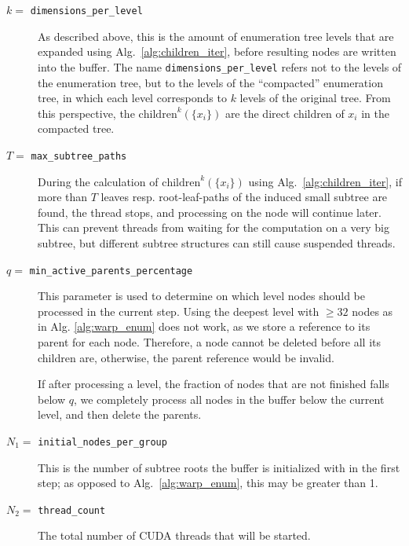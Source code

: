 \documentclass{scrartcl}
\begin{document}
    \begin{description}
        \item[$k =$ \texttt{dimensions\_per\_level}]
            As described above, this is the amount of enumeration tree levels that are expanded using Alg.\ \ref{alg:children_iter}, before resulting nodes are written into the buffer. The name \texttt{dimensions\_per\_level} refers not to the levels of the enumeration tree, but to the levels of the ``compacted'' enumeration tree, in which each level corresponds to $k$ levels of the original tree. From this perspective, the $\mathrm{children}^k(\{x_i\})$ are the direct children of $x_i$ in the compacted tree.
        \item[$T =$ \texttt{max\_subtree\_paths}] 
            During the calculation of $\mathrm{children}^k(\{x_i\})$ using Alg.\ \ref{alg:children_iter}, if more than $T$ leaves resp. root-leaf-paths of the induced small subtree are found, the thread stops, and processing on the node will continue later. This can prevent threads from waiting for the computation on a very big subtree, but different subtree structures can still cause suspended threads. 
        \item[$q =$ \texttt{min\_active\_parents\_percentage}]
            This parameter is used to determine on which level nodes should be processed in the current step. Using the deepest level with $\geq 32$ nodes as in Alg. \ref{alg:warp_enum} does not work, as we store a reference to its parent for each node. Therefore, a node cannot be deleted before all its children are, otherwise, the parent reference would be invalid. 
            
            If after processing a level, the fraction of nodes that are not finished falls below $q$, we completely process all nodes in the buffer below the current level, and then delete the parents.
        \item[$N_1 =$ \texttt{initial\_nodes\_per\_group}]
            This is the number of subtree roots the buffer is initialized with in the first step; as opposed to Alg.\ \ref{alg:warp_enum}, this may be greater than 1.
        \item[$N_2 =$ \texttt{thread\_count}]
            The total number of CUDA threads that will be started. 
    \end{description}
\end{document}
